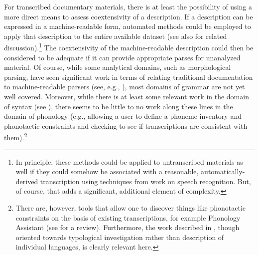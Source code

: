 For transcribed documentary materials, there is at least the possibility of
using a more direct means to assess coextensivity of a description. If a
description can be expressed in a machine-readable form, automated methods could
be employed to apply that description to the entire available dataset (see also
 for related discussion).{\footnote{In principle, these
methods could be applied to untranscribed materials as well if they could
somehow be associated with a reasonable, automatically-derived transcription
using techniques from work on speech recognition. But, of course, that adds a
significant, additional element of complexity.}} The coextensivity of the
machine-readable description could then be considered to be adequate if it can
provide appropriate parses for unanalyzed material. Of course, while some
analytical domains, such as morphological parsing, have seen significant work in
terms of relating traditional documentation to machine-readable parsers (see,
e.g., ), most domains of grammar are not yet well
covered. Moreover, while there is at least some relevant work in the domain of
syntax (see ), there seems to be little to no work along
these lines in the domain of phonology (e.g., allowing a user to define a
phoneme inventory and phonotactic constraints and checking to see if
transcriptions are consistent with them).{\footnote{There are, however, tools
that allow one to discover things like phonotactic constraints on the basis of
existing transcriptions, for example Phonology Assistant (see
 for a review). Furthermore, the work described
in , though oriented towards typological investigation
rather than description of individual languages, is clearly relevant here.}}

